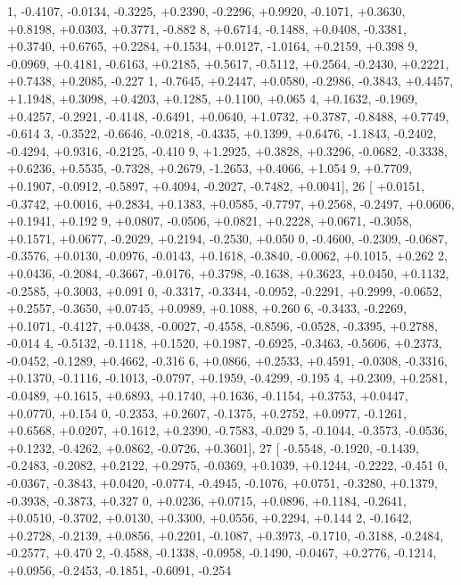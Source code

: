 \begin{DoxyCode}
      1, -0.4107, -0.0134, -0.3225, +0.2390, -0.2296, +0.9920, -0.1071, +0.3630, +0.8198, +0.0303, +0.3771, -0.882
      8, +0.6714, -0.1488, +0.0408, -0.3381, +0.3740, +0.6765, +0.2284, +0.1534, +0.0127, -1.0164, +0.2159, +0.398
      9, -0.0969, +0.4181, -0.6163, +0.2185, +0.5617, -0.5112, +0.2564, -0.2430, +0.2221, +0.7438, +0.2085, -0.227
      1, -0.7645, +0.2447, +0.0580, -0.2986, -0.3843, +0.4457, +1.1948, +0.3098, +0.4203, +0.1285, +0.1100, +0.065
      4, +0.1632, -0.1969, +0.4257, -0.2921, -0.4148, -0.6491, +0.0640, +1.0732, +0.3787, -0.8488, +0.7749, -0.614
      3, -0.3522, -0.6646, -0.0218, -0.4335, +0.1399, +0.6476, -1.1843, -0.2402, -0.4294, +0.9316, -0.2125, -0.410
      9, +1.2925, +0.3828, +0.3296, -0.0682, -0.3338, +0.6236, +0.5535, -0.7328, +0.2679, -1.2653, +0.4066, +1.054
      9, +0.7709, +0.1907, -0.0912, -0.5897, +0.4094, -0.2027, -0.7482, +0.0041],
26 [ +0.0151, -0.3742, +0.0016, +0.2834, +0.1383, +0.0585, -0.7797, +0.2568, -0.2497, +0.0606, +0.1941, +0.192
      9, +0.0807, -0.0506, +0.0821, +0.2228, +0.0671, -0.3058, +0.1571, +0.0677, -0.2029, +0.2194, -0.2530, +0.050
      0, -0.4600, -0.2309, -0.0687, -0.3576, +0.0130, -0.0976, -0.0143, +0.1618, -0.3840, -0.0062, +0.1015, +0.262
      2, +0.0436, -0.2084, -0.3667, -0.0176, +0.3798, -0.1638, +0.3623, +0.0450, +0.1132, -0.2585, +0.3003, +0.091
      0, -0.3317, -0.3344, -0.0952, -0.2291, +0.2999, -0.0652, +0.2557, -0.3650, +0.0745, +0.0989, +0.1088, +0.260
      6, -0.3433, -0.2269, +0.1071, -0.4127, +0.0438, -0.0027, -0.4558, -0.8596, -0.0528, -0.3395, +0.2788, -0.014
      4, -0.5132, -0.1118, +0.1520, +0.1987, -0.6925, -0.3463, -0.5606, +0.2373, -0.0452, -0.1289, +0.4662, -0.316
      6, +0.0866, +0.2533, +0.4591, -0.0308, -0.3316, +0.1370, -0.1116, -0.1013, -0.0797, +0.1959, -0.4299, -0.195
      4, +0.2309, +0.2581, -0.0489, +0.1615, +0.6893, +0.1740, +0.1636, -0.1154, +0.3753, +0.0447, +0.0770, +0.154
      0, -0.2353, +0.2607, -0.1375, +0.2752, +0.0977, -0.1261, +0.6568, +0.0207, +0.1612, +0.2390, -0.7583, -0.029
      5, -0.1044, -0.3573, -0.0536, +0.1232, -0.4262, +0.0862, -0.0726, +0.3601],
27 [ -0.5548, -0.1920, -0.1439, -0.2483, -0.2082, +0.2122, +0.2975, -0.0369, +0.1039, +0.1244, -0.2222, -0.451
      0, -0.0367, -0.3843, +0.0420, -0.0774, -0.4945, -0.1076, +0.0751, -0.3280, +0.1379, -0.3938, -0.3873, +0.327
      0, +0.0236, +0.0715, +0.0896, +0.1184, -0.2641, +0.0510, -0.3702, +0.0130, +0.3300, +0.0556, +0.2294, +0.144
      2, -0.1642, +0.2728, -0.2139, +0.0856, +0.2201, -0.1087, +0.3973, -0.1710, -0.3188, -0.2484, -0.2577, +0.470
      2, -0.4588, -0.1338, -0.0958, -0.1490, -0.0467, +0.2776, -0.1214, +0.0956, -0.2453, -0.1851, -0.6091, -0.254

\end{DoxyCode}

